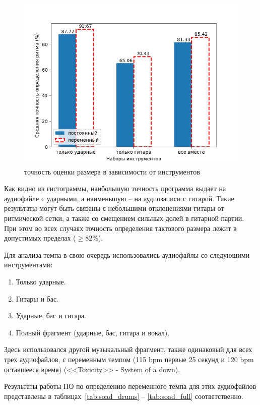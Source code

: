 \begin{figure}[h]
	\centering
	\includegraphics[scale=0.89]{../graphs/measure_instr.png}
	\caption{точность оценки размера в зависимости от инструментов}
	\label{img:measure_instr}
\end{figure}

\newpage

Как видно из гистограммы, наибольшую точность программа выдает на аудиофайле с ударными, а наименьшую -- на аудиозаписи с гитарой. Такие результаты могут быть связаны с небольшими отклонениями гитары от ритмической сетки, а также со смещением сильных долей в гитарной партии. При этом во всех случаях точность определения тактового размера лежит в допустимых пределах ($\ge82\%$).

Для анализа темпа в свою очередь использовались аудиофайлы со следующими инструментами:

\begin{enumerate}
	\item Только ударные.
	\item Гитары и бас.
	\item Ударные, бас и гитара.
	\item Полный фрагмент (ударные, бас, гитара и вокал).
\end{enumerate}

Здесь использовался другой музыкальный фрагмент, также одинаковый для всех трех аудиофайлов, с переменным темпом (115 bpm первые 25 секунд и 120 bpm оставшееся время) (<<Toxicity>> - System of a down).

Результаты работы ПО по определению переменного темпа для этих аудиофайлов представлены в таблицах~\ref{tab:soad_drums} -- \ref{tab:soad_full} соответственно.

